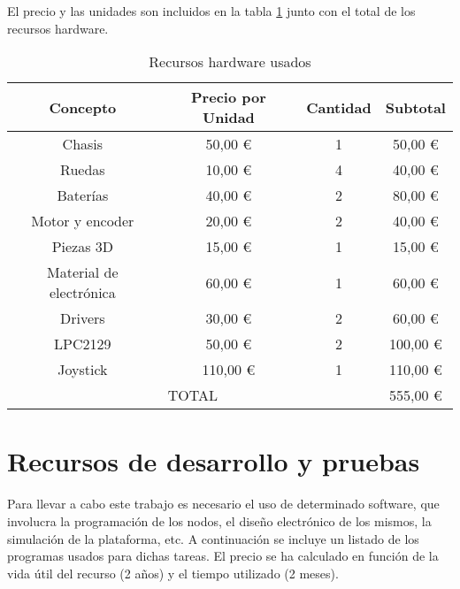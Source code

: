 El precio y las unidades son incluidos en la tabla \ref{tab:recursos_hardware} junto con el total de los recursos hardware.

\begin{table}[H]
\centering
\begin{tabular}{|c|c|c|c|}
\hline
Concepto                & Precio por Unidad & Cantidad & Subtotal \\ \hline
Chasis                  & 50,00 \euro               & 1        & 50,00 \euro        \\ \hline
Ruedas                  & 10,00 \euro                & 4        & 40,00 \euro       \\ \hline
Baterías                & 40,00 \euro                & 2        & 80,00 \euro       \\ \hline
Motor y encoder         & 20,00 \euro                & 2        & 40,00 \euro       \\ \hline
Piezas 3D               & 15,00 \euro                & 1        & 15,00 \euro       \\ \hline
Material de electrónica & 60,00 \euro                & 1        & 60,00 \euro       \\ \hline
Drivers                 & 30,00 \euro                & 2        & 60,00 \euro       \\ \hline
LPC2129                 & 50,00 \euro                & 2        & 100,00 \euro      \\ \hline
Joystick                & 110,00 \euro               & 1        & 110,00 \euro      \\ \hline
\multicolumn{3}{|c|}{TOTAL}                            & 555,00 \euro     \\ \hline
\end{tabular}
\caption{Recursos hardware usados}
\label{tab:recursos_hardware}
\end{table}

\section{Recursos de desarrollo y pruebas}
\label{sec:presupuesto-software}

Para llevar a cabo este trabajo es necesario el uso de determinado software, que involucra la programación de los nodos, el diseño electrónico de los mismos, la simulación de la plataforma, etc. A continuación se incluye un listado de los programas usados para dichas tareas. El precio se ha calculado en función de la vida útil del recurso (2 años) y el tiempo utilizado (2 meses).

